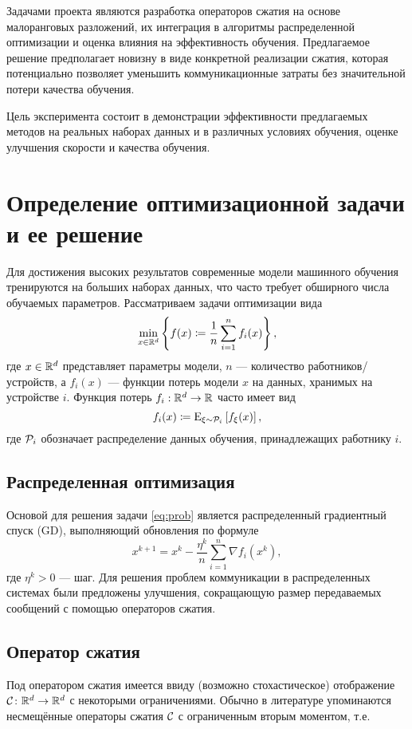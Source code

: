 \documentclass{article}
\begin{document}
Задачами проекта являются разработка операторов сжатия на основе малоранговых разложений, их интеграция в алгоритмы распределенной оптимизации и оценка влияния на эффективность обучения. Предлагаемое решение предполагает новизну в виде конкретной реализации сжатия, которая потенциально позволяет уменьшить коммуникационные затраты без значительной потери качества обучения.

Цель эксперимента состоит в демонстрации эффективности предлагаемых методов на реальных наборах данных и в различных условиях обучения, оценке улучшения скорости и качества обучения.

\section{Определение оптимизационной задачи и ее решение}
Для достижения высоких результатов современные модели машинного обучения тренируются на больших наборах данных, что часто требует обширного числа обучаемых параметров. Рассматриваем задачи оптимизации вида
\begin{align}\label{eq:prob}
\min \limits_{x \in \mathbb{R}^d} \left\{ f(x) \coloneqq \frac{1}{n} \sum \limits_{i=1}^n f_i(x) \right\},
\end{align}
где $x \in \mathbb{R}^d$ представляет параметры модели, $n$ — количество работников/устройств, а $f_i(x)$ — функции потерь модели $x$ на данных, хранимых на устройстве $i$. Функция потерь $f_i: \mathbb{R}^d \to \mathbb{R}$ часто имеет вид $$f_i(x) \coloneqq {\rm E}_{\xi \sim {\cal P}_i}\left[f_\xi(x)\right],$$ где ${\cal P}_i$ обозначает распределение данных обучения, принадлежащих работнику $i$.

\subsection{Распределенная оптимизация}
\def\stepsize{\eta}
Основой для решения задачи \eqref{eq:prob} является распределенный градиентный спуск (GD), выполняющий обновления по формуле
\[ x^{k+1} = x^k - \frac{\stepsize^k}{n} \sum \limits_{i=1}^n \nabla f_i(x^k), \]
где $\stepsize^k > 0$ — шаг. Для решения проблем коммуникации в распределенных системах были предложены улучшения, сокращающую размер передаваемых сообщений с помощью операторов сжатия.


\subsection{Оператор сжатия}
 
Под оператором сжатия имеется ввиду (возможно стохастическое) отображение${\cal C}\colon\mathbb{R}^d\to\mathbb{R}^d$ с некоторыми ограничениями.
Обычно в литературе упоминаются несмещённые операторы сжатия ${\cal C}$ с ограниченным вторым моментом, т.е.
\end{document}
